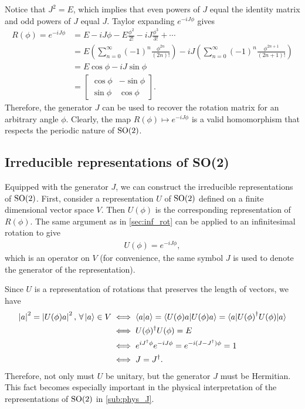     Notice that $J^2 = E$, which implies that even powers of $J$ equal the identity matrix and odd powers of $J$ equal $J$. Taylor expanding $e^{-iJ\phi }$ gives
    \begin{align*}
        R(\phi) = e^{-iJ\phi} &= E - iJ\phi - E \frac{\phi^2}{2!} - iJ\frac{\phi^3}{3!} + \cdots \\
        &= E\left( \sum_{n=0}^{\infty} {(-1)}^n \frac{\phi^{2n}}{(2n)!} \right) - iJ\left( \sum_{n=0}^{\infty} {(-1)}^n \frac{\phi^{2n+1}}{(2n+1)!} \right) \\
        &= E\cos\phi - iJ\sin\phi \\
        &= \begin{bmatrix}
            \cos\phi & -\sin\phi \\
            \sin\phi & \cos\phi
        \end{bmatrix}.
    \end{align*}
    Therefore, the generator $J$ can be used to recover the rotation matrix for an arbitrary angle $\phi$. Clearly, the map $R(\phi)\mapsto e^{-iJ\phi}$ is a valid homomorphism that respects the periodic nature of $\textrm{SO}{(2)}$.

    \subsection{Irreducible representations of SO(2)}\label{sub:irr_so2}
    Equipped with the generator $J$, we can construct the irreducible representations of $\textrm{SO}{(2)}$.
    First, consider a representation $U$ of $\textrm{SO}{(2)}$ defined on a finite dimensional vector space $V$. Then $U(\phi)$ is the corresponding representation of $R(\phi)$. The same argument as in \cref{sec:inf_rot} can be applied to an infinitesimal rotation to give
    \begin{align*}
        U(\phi) = e^{-iJ\phi},
    \end{align*}
    which is an operator on $V$ (for convenience, the same symbol $J$ is used to denote the generator of the representation).

    Since $U$ is a representation of rotations that preserves the length of vectors, we have
    \begin{align*}
        \left|a\right|^2 = \left|U(\phi)a\right|^2, \, \forall \ket{a}\in V &\iff \braket{a|a} = \braket{U(\phi)a|U(\phi)a} = \braket{a|{U(\phi)}^\dagger U(\phi)|a} \\
        &\iff U(\phi)^\dagger U(\phi) = E \\
        &\iff e^{iJ^\dagger\phi}e^{-iJ\phi} = e^{-i(J-J^\dagger)\phi} = 1 \\
        &\iff J = J^\dagger.
    \end{align*}
    Therefore, not only must $U$ be unitary, but the generator $J$ must be Hermitian. This fact becomes especially important in the physical interpretation of the representations of $\textrm{SO}{(2)}$ in \cref{sub:phys_J}.

